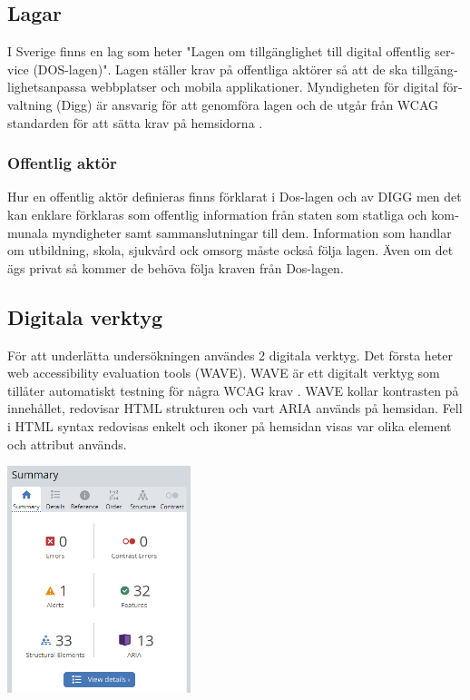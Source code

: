 \documentclass[11p]{article}
\begin{document}
\begin{otherlanguage}{swedish}
    \subsection{Lagar}
    I Sverige finns en lag som heter "Lagen om tillgänglighet till digital offentlig service (DOS-lagen)"\parencite{Dos-lagen}.
    Lagen ställer krav på offentliga aktörer så att de ska tillgänglighetsanpassa webbplatser och mobila applikationer.
    Myndigheten för digital förvaltning (Digg) är ansvarig för att genomföra lagen och de utgår från WCAG standarden för att sätta krav på hemsidorna \parencite{Utförande_av_Dos_lagen}.

    \subsubsection{Offentlig aktör}
    Hur en offentlig aktör definieras finns förklarat i Dos-lagen \parencite{Dos-lagen} och av DIGG \parencite{Om_Dos-lagen} men det kan enklare förklaras som offentlig information från staten som statliga och kommunala myndigheter samt sammanslutningar till dem.
    Information som handlar om utbildning, skola, sjukvård ock omsorg måste också följa lagen.
    Även om det ägs privat så kommer de behöva följa kraven från Dos-lagen.

    \subsection{Digitala verktyg}
    För att underlätta undersökningen användes 2 digitala verktyg.
    Det första heter web accessibility evaluation tools (WAVE).
    WAVE är ett digitalt verktyg som tillåter automatiskt testning för några WCAG krav \parencite{WAVE}.
    WAVE kollar kontrasten på innehållet, redovisar HTML strukturen och vart ARIA används på hemsidan.
    Fell i HTML syntax redovisas enkelt och ikoner på hemsidan visas var olika element och attribut används.

    \begin{center}

    \includegraphics[width=0.4\textwidth]{../images/WAVE.png}


\end{center}
\end{otherlanguage}
\end{document}
